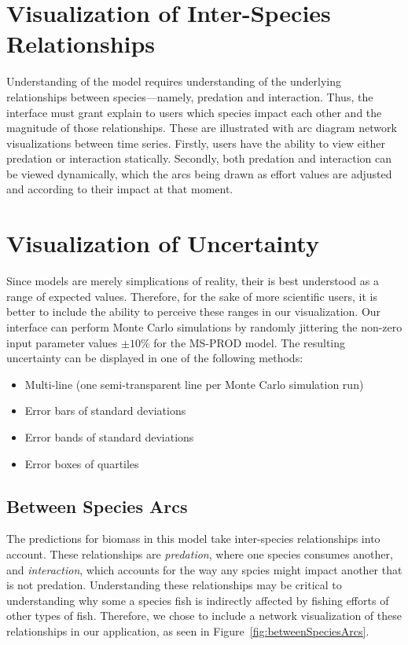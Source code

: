 \section{Visualization of Inter-Species Relationships}

Understanding of the model requires understanding of the underlying relationships between species---namely, predation and interaction.  Thus, the interface must grant explain to users which species impact each other and the magnitude of those relationships.  These are illustrated with arc diagram network visualizations between time series.  Firstly, users have the ability to view either predation or interaction statically.  Secondly, both predation and interaction can be viewed dynamically, which the arcs being drawn as effort values are adjusted and according to their impact at that moment.

\section{Visualization of Uncertainty}

Since models are merely simplications of reality, their is best understood as a range of expected values.  Therefore, for the sake of more scientific users, it is better to include the ability to perceive these ranges in our visualization.  Our interface can perform Monte Carlo simulations by randomly jittering the non-zero input parameter values $\pm 10\%$ for the MS-PROD model.  The resulting uncertainty can be displayed in one of the following methods:

 \begin{itemize}
   \item Multi-line (one semi-transparent line per Monte Carlo simulation run)
   \item Error bars of standard deviations
   \item Error bands of standard deviations
   \item Error boxes of quartiles
 \end{itemize}



\subsection{Between Species Arcs} 
\label{sec:betweenSpeciesArcs}

The predictions for biomass in this model take inter-species relationships into account.  These relationships are \textit{predation}, where one species consumes another, and \textit{interaction}, which accounts for the way any spcies might impact another that is not predation.  Understanding these relationships may be critical to understanding why some a species fish is indirectly affected by fishing efforts of other types of fish.  Therefore, we chose to include a network visualization of these relationships in our application, as seen in Figure~\ref{fig:betweenSpeciesArcs}.

